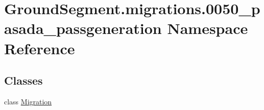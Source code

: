 \hypertarget{namespace_ground_segment_1_1migrations_1_10050__pasada__passgeneration}{}\section{Ground\+Segment.\+migrations.0050\+\_\+pasada\+\_\+passgeneration Namespace Reference}
\label{namespace_ground_segment_1_1migrations_1_10050__pasada__passgeneration}
\subsection*{Classes}
\begin{DoxyCompactItemize}
\item 
class \hyperlink{class_ground_segment_1_1migrations_1_10050__pasada__passgeneration_1_1_migration}{Migration}
\end{DoxyCompactItemize}
